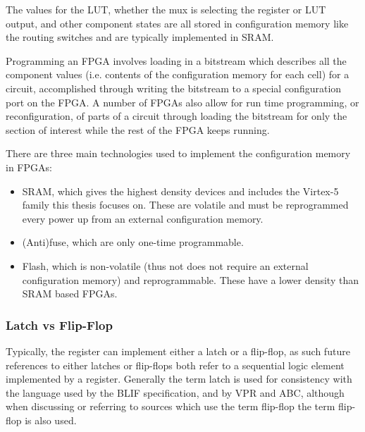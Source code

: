 \documentclass[12pt,final,oneside,a4paper]{dwThesis} %
\begin{document}
   The values for the \gls{LUT}, whether the \gls{mux} is selecting the
   register or \gls{LUT} output, and other component states are all stored in
   configuration memory like the routing switches and are typically implemented
   in \gls{SRAM}.
   
   Programming an \gls{FPGA} involves loading in a bitstream which describes
   all the component values (i.e. contents of the configuration memory for each
   cell) for a circuit, accomplished through writing the bitstream to a special
   configuration port on the \gls{FPGA}. A number of \glspl{FPGA} also allow
   for run time programming, or reconfiguration, of parts of a circuit through
   loading the bitstream for only the section of interest while the rest of the
   \gls{FPGA} keeps running.

   There are three main
   technologies used to implement the configuration memory in \glspl{FPGA}:

   \begin{itemize}

      \item \gls{SRAM}, which gives the highest density devices and includes
         the Virtex-5 family this thesis focuses on. These are volatile and
         must be reprogrammed every power up from an external configuration
         memory.
      \item (Anti)fuse, which are only one-time programmable.
      \item Flash, which is non-volatile (thus not does not require an external
         configuration memory) and reprogrammable. These have a lower
         density than \gls{SRAM} based \glspl{FPGA}\cite{FPGAArch}.

   \end{itemize}
   \subsubsection{Latch vs Flip-Flop}
   Typically, the register can implement either a latch or a flip-flop,
   as such future references to either latches or flip-flops both refer to a sequential logic element 
   implemented by a register.
   Generally the term latch is used for consistency with the language used by
   the \gls{BLIF} specification, and by \gls{VPR} and \gls{ABC}, although when discussing or referring to sources
   which use the term flip-flop the term flip-flop is also used.
   
\end{document}
